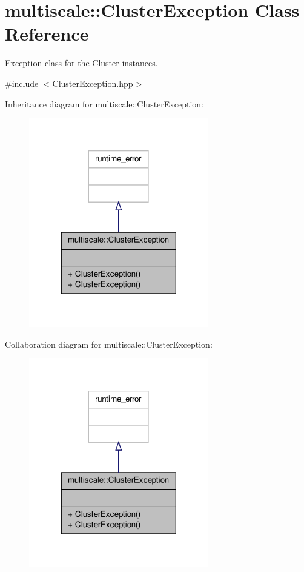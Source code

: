 \hypertarget{classmultiscale_1_1ClusterException}{\section{multiscale\-:\-:Cluster\-Exception Class Reference}
\label{classmultiscale_1_1ClusterException}
}


Exception class for the Cluster instances.  




{\ttfamily \#include $<$Cluster\-Exception.\-hpp$>$}



Inheritance diagram for multiscale\-:\-:Cluster\-Exception\-:\nopagebreak
\begin{figure}[H]
\begin{center}
\leavevmode
\includegraphics[width=222pt]{classmultiscale_1_1ClusterException__inherit__graph}
\end{center}
\end{figure}


Collaboration diagram for multiscale\-:\-:Cluster\-Exception\-:\nopagebreak
\begin{figure}[H]
\begin{center}
\leavevmode
\includegraphics[width=222pt]{classmultiscale_1_1ClusterException__coll__graph}
\end{center}
\end{figure}
